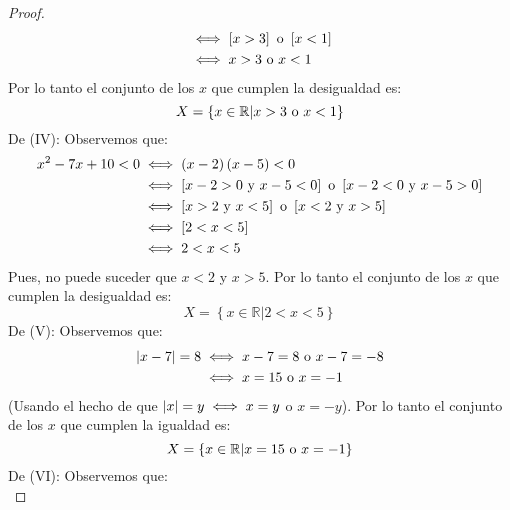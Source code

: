\documentclass[12pt]{article}
\begin{document}
\begin{enumerate}
\begin{proof}
\begin{equation*}
\begin{split}
                &\iff \left[x > 3\right] \textup{ o } \left[x < 1\right] \\
                &\iff x > 3 \textup{ o } x < 1
            \end{split}
        \end{equation*}
        Por lo tanto el conjunto de los $x$ que cumplen la desigualdad es: 
        \begin{equation*}
            X = \left\{x\in\mathbb{R}|x>3 \textup{ o } x < 1\right\}
        \end{equation*}
        De (IV): Observemos que:
        \begin{equation*}
            \begin{split}
                x^2-7x+10<0 &\iff \left(x-2\right)\left(x-5\right) < 0\\
                &\iff \left[x-2 > 0 \textup{ y } x-5 < 0\right] \textup{ o } \left[x-2 < 0 \textup{ y } x-5 > 0\right] \\
                &\iff \left[x > 2 \textup{ y } x < 5\right] \textup{ o } \left[x < 2 \textup{ y } x > 5\right] \\
                &\iff \left[2 < x < 5\right] \\
                &\iff 2 < x < 5
            \end{split}
        \end{equation*}
        Pues, no puede suceder que $x < 2$ y $x > 5$. Por lo tanto el conjunto de los $x$ que cumplen la desigualdad es: 
        \begin{equation*}
            X = \left\{x\in\mathbb{R}|2 < x < 5\right\}
        \end{equation*}
        De (V): Observemos que:
        \begin{equation*}
            \begin{split}
                \left| x-7 \right|=8 &\iff x-7=8 \textup{ o }x-7=-8\\
                &\iff x=15 \textup{ o }x=-1\\
            \end{split}
        \end{equation*}
        (Usando el hecho de que $\left| x \right|=y\iff x=y$ o $x=-y$). Por lo tanto el conjunto de los $x$ que cumplen la igualdad es:
        \begin{equation*}
            X = \left\{x\in\mathbb{R}|x = 15 \textup{ o } x = -1\right\}
        \end{equation*}
        De (VI): Observemos que:
        \begin{equation*}

\end{equation*}
\end{proof}
\end{enumerate}
\end{document}
